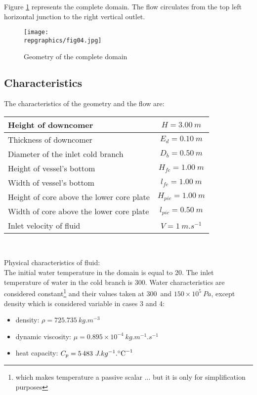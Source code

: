 Figure \ref{figante21} represents the complete domain. The flow circulates from
the top left horizontal junction to the right vertical outlet. 

\begin{figure}[h!]
\begin{center}
\texttt{[image: \\repgraphics/fig04.jpg]} 
\caption{Geometry of the complete domain}
\label{figante21}
\end{center}
\end{figure}


	\subsection{Characteristics}

The characteristics of the geometry and the flow are:
\begin{center}
\begin{tabular}{|l|c|}
\hline
Height of downcomer & $H = 3.00\ m$ \\
\hline 
Thickness of downcomer & $E_{d} = 0.10\ m$ \\ 
\hline 
Diameter of the inlet cold branch & $D_{b} = 0.50\ m$ \\ 
\hline 
Height of vessel's bottom & $H_{fc} = 1.00\ m$ \\ 
\hline 
Width of vessel's bottom & $l_{fc} = 1.00\ m$ \\ 
\hline 
Height of core above the lower core plate & $H_{pic} = 1.00\ m$ \\ 
\hline 
Width of core above the lower core plate & $l_{pic} = 0.50\ m$ \\ 
\hline 
Inlet velocity of fluid & $V = 1\ m.s^{-1}$ \\ 
\hline 
\end{tabular}\\
\end{center}

Physical characteristics of fluid:\\
The initial water temperature in the domain is equal to 20\degresC.
The inlet temperature of water in the cold branch is 300\degresC.
Water characteristics are considered constant\footnote{which makes temperature a
passive scalar ... but it is only for simplification purposes} and their values taken at
300\degresC\ and $150\times 10^{5}\ Pa$, except density which is considered
variable in cases 3 and 4: 
\begin{itemize}
	\item density: $\rho = 725.735\ kg.m^{-3}$ 
	\item dynamic viscosity: $\mu = 0.895\times10^{-4}\ kg.m^{-1}.s^{-1}$
	\item heat capacity: $C_{p} = 5\,483\ J.kg^{-1}.\mbox{\degresC}^{-1}$ 
\end{itemize}



